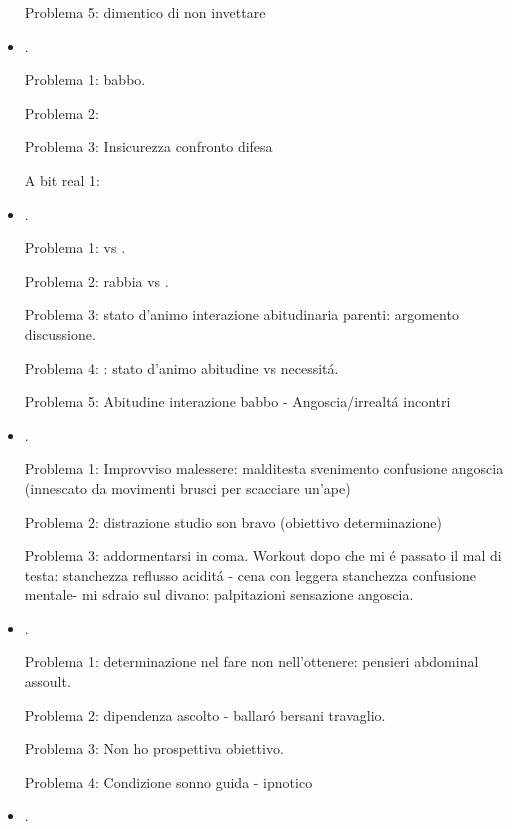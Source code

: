 \begin{itemize}
Problema 5: dimentico di non invettare 

\item {}.

Problema 1:  babbo.

Problema 2: 

Problema 3: Insicurezza confronto difesa

A bit real 1:  

\item {}.

Problema 1:  vs .

Problema 2: rabbia vs .

Problema 3: stato d'animo interazione abitudinaria parenti: argomento discussione.

Problema 4: : stato d'animo abitudine vs necessit\'a.

Problema 5: Abitudine interazione babbo - Angoscia/irrealt\'a incontri

\item {}.

Problema 1: Improvviso malessere: malditesta svenimento confusione angoscia (innescato da movimenti brusci per scacciare un'ape)

Problema 2: distrazione studio son bravo (obiettivo determinazione)

Problema 3: addormentarsi in coma. Workout dopo che mi \'e passato il mal di testa: stanchezza reflusso acidit\'a - cena con leggera stanchezza confusione mentale- mi sdraio sul divano: palpitazioni sensazione angoscia.

\item {}.

Problema 1: determinazione nel fare non nell'ottenere: pensieri abdominal assoult.

Problema 2: dipendenza ascolto - ballar\'o bersani travaglio.

Problema 3: Non ho prospettiva obiettivo.

Problema 4: Condizione sonno guida - ipnotico


\item {}.


\end{itemize}
